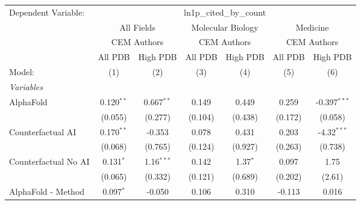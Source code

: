 \begingroup
\centering
\begin{tabular}{lcccccc}
   \tabularnewline \midrule \midrule
   Dependent Variable: & \multicolumn{6}{c}{ln1p\_cited\_by\_count}\\
 & \multicolumn{2}{c}{All Fields} & \multicolumn{2}{c}{Molecular Biology} & \multicolumn{2}{c}{Medicine} \\
\cmidrule(lr){2-3} \cmidrule(lr){4-5} \cmidrule(lr){6-7}
 & \multicolumn{2}{c}{CEM Authors} & \multicolumn{2}{c}{CEM Authors} & \multicolumn{2}{c}{CEM Authors} \\
\cmidrule(lr){2-3} \cmidrule(lr){4-5} \cmidrule(lr){6-7}
 & \multicolumn{1}{c}{All PDB} & \multicolumn{1}{c}{High PDB} & \multicolumn{1}{c}{All PDB} & \multicolumn{1}{c}{High PDB} & \multicolumn{1}{c}{All PDB} & \multicolumn{1}{c}{High PDB} \\
\cmidrule(lr){2-2} \cmidrule(lr){3-3} \cmidrule(lr){4-4} \cmidrule(lr){5-5} \cmidrule(lr){6-6} \cmidrule(lr){7-7}
   Model:                                                     & (1)          & (2)          & (3)            & (4)           & (5)           & (6)\\  
   \midrule
   \emph{Variables}\\
   AlphaFold                                                  & 0.120$^{**}$ & 0.667$^{**}$ & 0.149          & 0.449         & 0.259         & -0.397$^{***}$\\   
                                                              & (0.055)      & (0.277)      & (0.104)        & (0.438)       & (0.172)       & (0.058)\\   
   Counterfactual AI                                          & 0.170$^{**}$ & -0.353       & 0.078          & 0.431         & 0.203         & -4.32$^{***}$\\   
                                                              & (0.068)      & (0.765)      & (0.124)        & (0.927)       & (0.263)       & (0.738)\\   
   Counterfactual No AI                                       & 0.131$^{*}$  & 1.16$^{***}$ & 0.142          & 1.37$^{*}$    & 0.097         & 1.75\\   
                                                              & (0.065)      & (0.332)      & (0.121)        & (0.689)       & (0.202)       & (2.61)\\   
   AlphaFold - Method                                         & 0.097$^{*}$  & -0.050       & 0.106          & 0.310         & -0.113        & 0.016\\   

\end{tabular}
